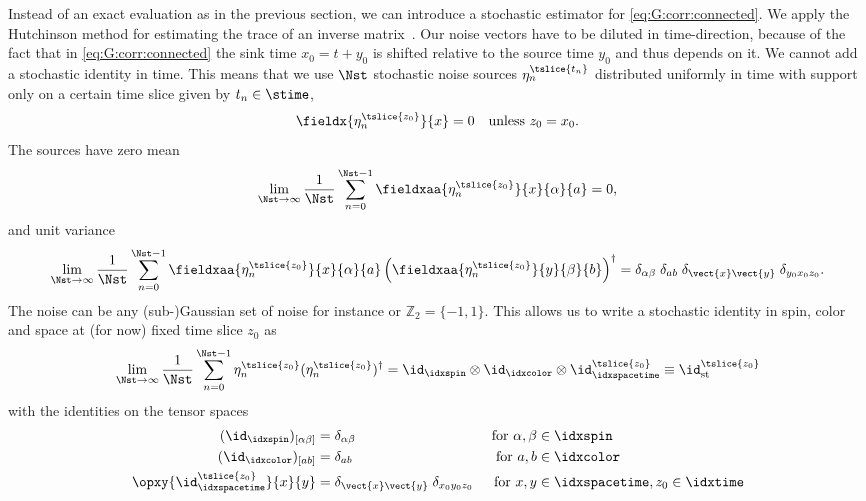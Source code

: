 Instead of an exact evaluation as in the previous section, we can introduce a stochastic estimator for \cref{eq:G:corr:connected}.
We apply the Hutchinson method for estimating the trace of an inverse matrix~\cite{Hutchinson01011990,Michael:1998sg}.
Our noise vectors have to be diluted in time-direction, because of the fact that in \cref{eq:G:corr:connected} the sink time $x_0 = t + y_0$ is shifted relative to the source time $y_0$ and thus depends on it.
We cannot add a stochastic identity in time.
This means that we use $\Nst$ stochastic noise sources $\eta_n^{\tslice{t_n}}$ distributed uniformly in time with support only on a certain time slice given by $t_n \in \stime$,
\begin{equation} \label{eq:stoch:time_dilution}
\fieldx{\eta^{\tslice{z_0}}_n}{x} = 0
\quad
\text{unless } z_0 = x_0.
\end{equation}
The sources have zero mean
\begin{equation}
\lim_{\Nst \to \infty}
  \frac{1}{\Nst}
    \sum_{n=0}^{\Nst-1}
      \fieldxaa{\eta^{\tslice{z_0}}_{n}}{x}{\alpha}{a}
 = 0,
\end{equation}
and unit variance
\begin{equation}
\lim_{\Nst \to \infty}
  \frac{1}{\Nst}
    \sum_{n=0}^{\Nst-1}
      \fieldxaa{\eta^{\tslice{z_0}}_{n}}{x}{\alpha}{a}
      \left( \fieldxaa{\eta_n^{\tslice{z_0}}}{y}{\beta}{b} \right)^{\dagger}
=
\delta_{\alpha \beta} \;
\delta_{ab} \;
\delta_{\vect{x} \vect{y}} \;
\delta_{y_0 x_0 z_0}.
\end{equation}
The noise can be any (sub-)Gaussian set of noise for instance  or $\mathbb{Z}_2 = \{-1, 1\}$.
This allows us to write a stochastic identity in spin, color and space at (for now) fixed time slice $z_0$ as
\begin{equation} \label{eq:stoch:id}
\lim_{\Nst \to \infty}
  \frac{1}{\Nst}
    \sum_{n=0}^{\Nst-1}
      \eta_n^{\tslice{z_0}}
      (\eta_n^{\tslice{z_0}})^{\dagger}
= \id_{\idxspin} \otimes \id_{\idxcolor} \otimes \id^{\tslice{z_0}}_{\idxspacetime}
\equiv \id^{\tslice{z_0}}_{\text{st}}
\end{equation}
with the identities on the tensor spaces 
\begin{align}
(\id_{\idxspin})_{[\alpha \beta]} &= \delta_{\alpha \beta}
& \text{ for } \alpha, \beta &\in \idxspin \\
(\id_{\idxcolor})_{[ab]} &= \delta_{ab}
& \text{ for } a, b &\in \idxcolor \\
\opxy{\id^{\tslice{z_0}}_{\idxspacetime}}{x}{y} &= \delta_{\vect{x} \vect{y}} \; \delta_{x_0 y_0 z_0}
& \text{ for } x, y &\in \idxspacetime, z_0 \in \idxtime
\end{align}

